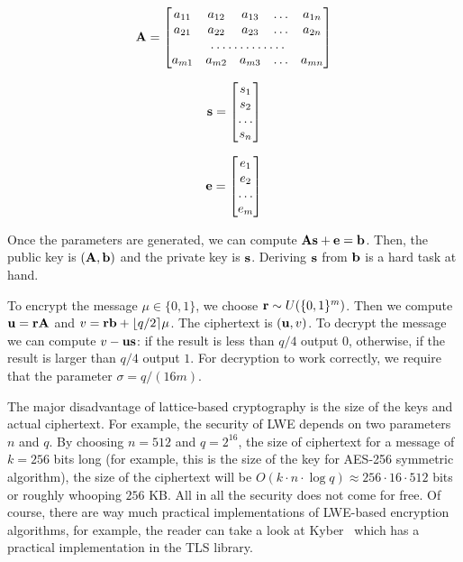 \begin{equation}
 {\bf A}=\begin{bmatrix}
 a_{11}       & a_{12} & a_{13} & \dots & a_{1n} \\
 a_{21}       & a_{22} & a_{23} & \dots & a_{2n} \\
 \hdotsfor{5} \\
 a_{m1}       & a_{m2} & a_{m3} & \dots & a_{mn}
    \end{bmatrix}
\end{equation}

\begin{equation}
 {\bf s}=\begin{bmatrix}
 s_{1} \\
 s_{2} \\
 \dots \\
 s_{n} 
    \end{bmatrix}
\end{equation}

\begin{equation}
 {\bf e}=\begin{bmatrix}
 e_{1} \\
 e_{2} \\
 \dots \\
 e_{m} 
    \end{bmatrix}
\end{equation}

Once the parameters are generated, we can compute ${\bf As}+{\bf e} = {\bf b}$. Then, the public 
key is $({\bf A, b})$ and the private key is ${\bf s}$. Deriving ${\bf s}$ from ${\bf b}$ is a hard 
task at hand.

To encrypt the message $\mu \in \{0, 1\}$, we choose ${\bf r} \sim U(\{0, 1\}^m)$. Then we compute ${\bf u}={\bf rA}$ and 
$v={\bf rb}+\lfloor q/2 \rceil \mu$. The ciphertext is $({\bf u}, v)$. To decrypt the message we can 
compute $v - \bf{u s}$: if the result is less than $q/4$ output $0$, otherwise, if the result
is larger than $q/4$ output $1$. For decryption to work correctly, we require that the parameter $\sigma = q/(16m)$. 

The major disadvantage of lattice-based cryptography is the size of the keys and actual ciphertext. For example,
the security of LWE depends on two parameters $n$ and $q$. By choosing $n=512$ and $q=2^{16}$, the size of ciphertext
for a message of $k=256$ bits long (for example, this is the size of the key for AES-256 symmetric algorithm), 
the size of the ciphertext will be $O(k \cdot n \cdot \log q) \approx 256 \cdot 16 \cdot 512$ bits or roughly whooping 
$256$ KB. All in all the security does not come for free. Of course, there are way much practical implementations
of LWE-based encryption algorithms, for example, the reader can take a look at Kyber~\cite{nist:kyber} which has a practical 
implementation in the TLS library.

